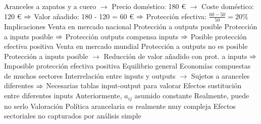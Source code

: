 \documentclass{nuevotema}
\begin{document}
\begin{esquemal}
				\4[] Aranceles a zapatos y a cuero
				\4[] $\to$ Precio doméstico: 180 €
				\4[] $\to$ Coste doméstico: 120 €
				\4[] $\Rightarrow$ Valor añadido: 180 - 120 = 60 €
				\4[] $\Rightarrow$ Protección efectiva: $\frac{60 -  50}{50}= 20\%$
			\3 Implicaciones
				\4 Venta en mercado nacional
				\4[] Protección a outputs posible
				\4[] Protección a inputs posible
				\4[] $\Rightarrow$ Protección outputs compensa inputs
				\4[] $\Rightarrow$ Posible protección efectiva positiva
				\4 Venta en mercado mundial
				\4[] Protección a outputs no es posible
				\4[] Protección a inputs posible
				\4[] $\to$ Reducción de valor añadido con prot. a inputs
				\4[] $\Rightarrow$ Imposible protección efectiva positiva
				\4 Equilibrio general
				\4[] Economías compuestas de muchos sectores
				\4[] Interrelación entre inputs y outputs
				\4[] $\to$ Sujetos a aranceles diferentes
				\4[] $\Rightarrow$ Necesarias tablas input-output para valorar
				\4 Efectos sustitución entre diferentes inputs
				\4[] Anteriormente, $a_{ij}$ asumido constante
				\4[] Realmente, puede no serlo
			\3 Valoración
				\4 Política arancelaria es realmente muy compleja
				\4 Efectos sectoriales no capturados por análisis simple


\end{esquemal}
\end{document}
